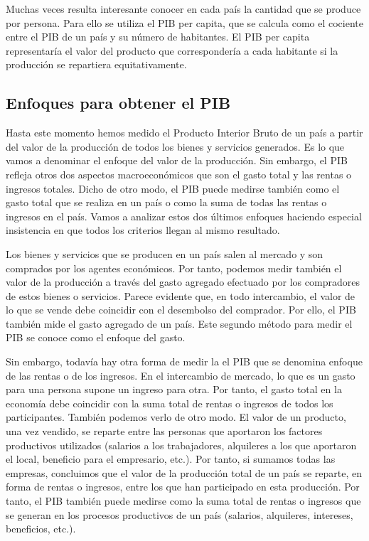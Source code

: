 \documentclass[
]{krantz}
\begin{document}
Muchas veces resulta interesante conocer en cada país la cantidad que se produce por persona. Para ello se utiliza el PIB per capita, que se calcula como el cociente entre el PIB de un país y su número de habitantes. El PIB per capita representaría el valor del producto que correspondería a cada habitante si la producción se repartiera equitativamente.

\hypertarget{enfoques-para-obtener-el-pib}{%
\subsection{Enfoques para obtener el PIB}\label{enfoques-para-obtener-el-pib}}

Hasta este momento hemos medido el Producto Interior Bruto de un país a partir del valor de la producción de todos los bienes y servicios generados. Es lo que vamos a denominar el enfoque del valor de la producción. Sin embargo, el PIB refleja otros dos aspectos macroeconómicos que son el gasto total y las rentas o ingresos totales. Dicho de otro modo, el PIB puede medirse también como el gasto total que se realiza en un país o como la suma de todas las rentas o ingresos en el país. Vamos a analizar estos dos últimos enfoques haciendo especial insistencia en que todos los criterios llegan al mismo resultado.

Los bienes y servicios que se producen en un país salen al mercado y son comprados por los agentes económicos. Por tanto, podemos medir también el valor de la producción a través del gasto agregado efectuado por los compradores de estos bienes o servicios. Parece evidente que, en todo intercambio, el valor de lo que se vende debe coincidir con el desembolso del comprador. Por ello, el PIB también mide el gasto agregado de un país. Este segundo método para medir el PIB se conoce como el enfoque del gasto.

Sin embargo, todavía hay otra forma de medir la el PIB que se denomina enfoque de las rentas o de los ingresos. En el intercambio de mercado, lo que es un gasto para una persona supone un ingreso para otra. Por tanto, el gasto total en la economía debe coincidir con la suma total de rentas o ingresos de todos los participantes. También podemos verlo de otro modo. El valor de un producto, una vez vendido, se reparte entre las personas que aportaron los factores productivos utilizados (salarios a los trabajadores, alquileres a los que aportaron el local, beneficio para el empresario, etc.). Por tanto, si sumamos todas las empresas, concluimos que el valor de la producción total de un país se reparte, en forma de rentas o ingresos, entre los que han participado en esta producción. Por tanto, el PIB también puede medirse como la suma total de rentas o ingresos que se generan en los procesos productivos de un país (salarios, alquileres, intereses, beneficios, etc.).
\end{document}
